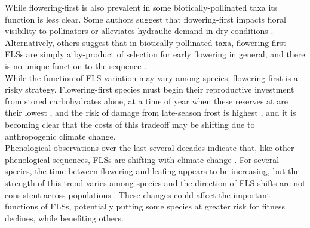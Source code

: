 \documentclass[12pt]{article}\usepackage[]{graphicx}\usepackage[]{color}
\begin{document}
\noindent While flowering-first is also prevalent in some biotically-pollinated taxa its function is less clear. Some authors suggest that flowering-first impacts floral visibility to pollinators \citep{Janzen1967, Bukovac:2017aa,Forrest:2009aa} or alleviates hydraulic demand in dry conditions \citep{Gougherty2018,Franklin2016}. Alternatively, others suggest that in biotically-pollinated taxa, flowering-first FLSs are simply a by-product of selection for early flowering in general, and there is no unique function to the sequence \citep{Primack1987}.\\ 

\noindent While the function of FLS variation may vary among species, flowering-first is a risky strategy. Flowering-first species must begin their reproductive investment from stored carbohydrates alone, at a time of year when these reserves at are their lowest \citep{Primack1987}, and the risk of damage from late-season frost is highest \citep{Zohner2020}, and it is becoming clear that the costs of this tradeoff may be shifting due to anthropogenic climate change.\\ 

\noindent Phenological observations over the last several decades indicate that, like other phenological sequences, FLSs are shifting with climate change \citep{Ma2020:aa}. For several species, the time between flowering and leafing appears to be increasing, but the strength of this trend varies among species and the direction of FLS shifts are not consistent across populations \citep{Buonaiuto2020,Ma2020:aa}. These changes could affect the important functions of FLSs, potentially putting some species at greater risk for fitness declines, while benefiting others.\\
\end{document}
